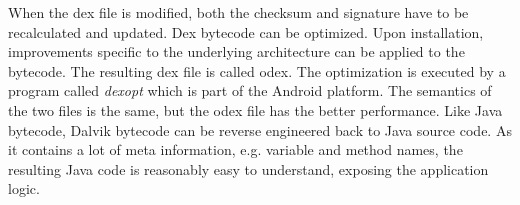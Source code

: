 When the \gls{dex} file is modified, both the checksum and signature have to be recalculated and updated. \cite{developersDalvik} \cite{ehringerDalvik}
\newline
Dex bytecode can be optimized.
Upon installation, improvements specific to the underlying architecture can be applied to the bytecode.
The resulting \gls{dex} file is called \gls{odex}.
The optimization is executed by a program called \textit{dexopt} which is part of the Android platform.
The semantics of the two files is the same, but the \gls{odex} file has the better performance.
\newline
Like Java bytecode, Dalvik bytecode can be reverse engineered back to Java source code.
As it contains a lot of meta information, e.g. variable and method names, the resulting Java code is reasonably easy to understand, exposing the application logic.
